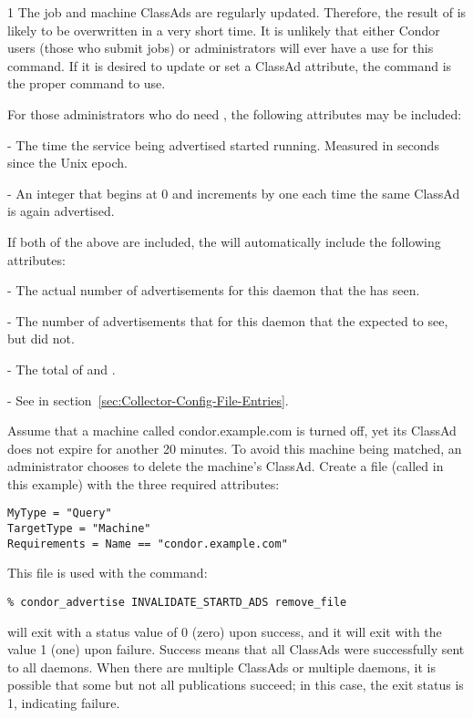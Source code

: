 \begin{ManPage}{\label{man-condor-advertise}}{1}
\GenRem
The job and machine ClassAds are regularly updated.
Therefore, the result of  is likely to be
overwritten in a very short time.
It is unlikely that either Condor users (those who submit jobs)
or administrators will ever have a use for this command.
If it is desired to update or set a ClassAd attribute, the
 command is the proper command to use.

For those administrators who do need , the following
attributes may be included:

 - The time the service being advertised 
started running.  Measured in seconds since the Unix epoch.

 - An integer that begins at 0 and increments by
one each time the same ClassAd is again advertised.

If both of the above are included, the  will
automatically include the following attributes:

 - The actual number of advertisements for this
daemon that the  has seen.

 - The number of advertisements that for this daemon
that the  expected to see, but did not.

 - The total of  and 
.

 - See  in
section~\ref{sec:Collector-Config-File-Entries}.

\Examples

Assume that a machine called condor.example.com is turned off,
yet its  ClassAd does not expire for another 20 minutes.
To avoid this machine being matched, an administrator chooses
to delete the machine's  ClassAd.
Create a file (called  in this example)
with the three required attributes:
\begin{verbatim}
MyType = "Query"
TargetType = "Machine"
Requirements = Name == "condor.example.com"
\end{verbatim}

This file is used with the command:
\begin{verbatim}
% condor_advertise INVALIDATE_STARTD_ADS remove_file 
\end{verbatim}

\ExitStatus

 will exit with a status value of 0 (zero) upon
success, and it will exit with the value 1 (one) upon failure.
Success means that all ClassAds were successfully sent to all 
 daemons.
When there are multiple ClassAds or multiple  daemons,
it is possible that some but not all publications succeed;
in this case, the exit status is 1, indicating failure.

\end{ManPage}
